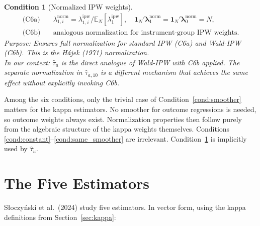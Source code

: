 \documentclass[12pt, a4paper]{article}
\theoremstyle{condstyle}
\newtheorem{condition}{Condition}[section]
\theoremstyle{plain}
\newcommand{\EN}{\mathbb{E}_N}
\newcommand{\bone}{\mathbf{1}_N}
\newcommand{\that}[1]{\hat{\tau}_{#1}}
\begin{document}
\begin{condition}[Normalized IPW weights]\label{cond:ipwnorm}
  \begin{align*}
    \text{(C6a)} &\quad \lambda^{\mathrm{norm}}_{1,i} = \lambda^{\mathrm{ipw}}_{1,i}\big/\EN[\lambda^{\mathrm{ipw}}_1],\quad
                         \bone'\boldsymbol{\lambda}^{\mathrm{norm}}_1 = \bone'\boldsymbol{\lambda}^{\mathrm{norm}}_0 = N,\\
    \text{(C6b)} &\quad \text{analogous normalization for instrument-group IPW weights.}
  \end{align*}
  \textit{Purpose:} Ensures full normalization for standard IPW (C6a) and Wald-IPW (C6b).
  This is the Hájek (1971) normalization.\\
  \textit{In our context:} $\that{u}$ is the direct analogue of Wald-IPW with C6b applied.
  The separate normalization in $\that{a,10}$ is a different mechanism that achieves
  the same effect without explicitly invoking C6b.
\end{condition}

\begin{notebox}
Among the six conditions, only the trivial case of Condition~\ref{cond:smoother} matters
for the kappa estimators. No smoother for outcome regressions is needed,
so outcome weights always exist. Normalization properties then follow purely from
the algebraic structure of the kappa weights themselves.
Conditions \ref{cond:constant}--\ref{cond:same_smoother} are irrelevant.
Condition~\ref{cond:ipwnorm} is implicitly used by $\that{u}$.
\end{notebox}

\section{The Five Estimators}
\label{sec:estimators}

S\l oczy\'nski et al.\ (2024) study five estimators. In vector form, using the kappa definitions
from Section~\ref{sec:kappa}:
\end{document}
